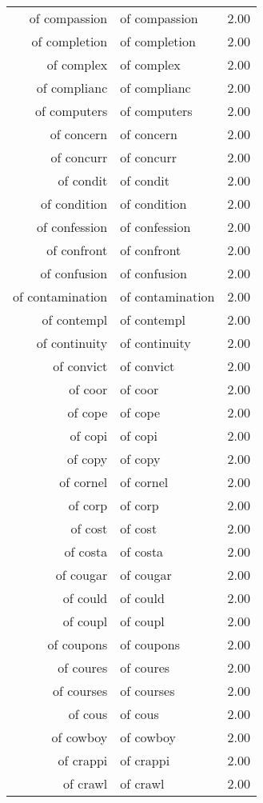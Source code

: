 \begin{table}[ht]
\begin{tabular}{rlr}
  of compassion & of compassion & 2.00 \\ 
  of completion & of completion & 2.00 \\ 
  of complex & of complex & 2.00 \\ 
  of complianc & of complianc & 2.00 \\ 
  of computers & of computers & 2.00 \\ 
  of concern & of concern & 2.00 \\ 
  of concurr & of concurr & 2.00 \\ 
  of condit & of condit & 2.00 \\ 
  of condition & of condition & 2.00 \\ 
  of confession & of confession & 2.00 \\ 
  of confront & of confront & 2.00 \\ 
  of confusion & of confusion & 2.00 \\ 
  of contamination & of contamination & 2.00 \\ 
  of contempl & of contempl & 2.00 \\ 
  of continuity & of continuity & 2.00 \\ 
  of convict & of convict & 2.00 \\ 
  of coor & of coor & 2.00 \\ 
  of cope & of cope & 2.00 \\ 
  of copi & of copi & 2.00 \\ 
  of copy & of copy & 2.00 \\ 
  of cornel & of cornel & 2.00 \\ 
  of corp & of corp & 2.00 \\ 
  of cost & of cost & 2.00 \\ 
  of costa & of costa & 2.00 \\ 
  of cougar & of cougar & 2.00 \\ 
  of could & of could & 2.00 \\ 
  of coupl & of coupl & 2.00 \\ 
  of coupons & of coupons & 2.00 \\ 
  of coures & of coures & 2.00 \\ 
  of courses & of courses & 2.00 \\ 
  of cous & of cous & 2.00 \\ 
  of cowboy & of cowboy & 2.00 \\ 
  of crappi & of crappi & 2.00 \\ 
  of crawl & of crawl & 2.00 \\ 

\end{tabular}
\end{table}
